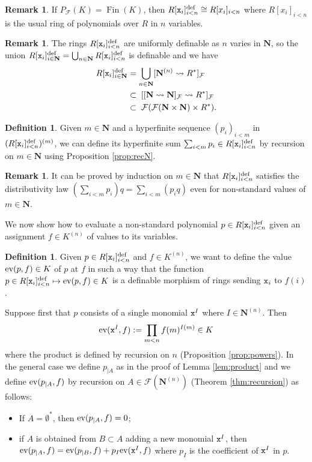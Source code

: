 \documentclass{amsart}
\newcommand{\ca}{\mathcal}
\newcommand{\Fin}{\operatorname{Fin}}
\theoremstyle{plain}
\theoremstyle{definition}
\newtheorem{rem}[thm]{Remark}
\newtheorem{defn}[thm]{Definition}
\newcommand{\ev}{\textnormal{ev}}
\newcommand{\F}{\mathcal{F}}
\newcommand{\pF}{P_{\ca F}}
\newcommand{\hn}{\mathbf N}
\newcommand{\pto}{\leadsto} %
\newcommand{\pfun}[2]{[#1 \pto #2]_{\F}}
\newcommand{\Polyn}[1]{{#1}[{\tt x}_i]_{i \in \hn}^{\text{def}}}
\newcommand{\polyn}[2]{{#1}[{\tt x}_i]_{i<#2}^\text{def}}
\begin{document}
\begin{rem} \label{rem:standard poly} If $\pF(K) = \Fin(K)$, then $\polyn R n \cong R[x_i]_{i<n}$ where $R[x_i]_{i<n}$ is the usual ring of polynomials over $R$ in $n$ variables. 
\end{rem}

\begin{rem}
The rings $\polyn R n$ are uniformly definable as $n$ varies in $\hn$, so the union $\Polyn R = \bigcup_{n\in \hn} \polyn R n$ is definable and we have 
 \begin{align*}
 \Polyn R & = \bigcup_{n\in \hn} \pfun{\hn^{(n)}}{R^*}\\
 & \subset \; \pfun {\pfun {\hn} {\hn}} {R^*}\\
  & \subset \; \F (\F (\hn \times \hn) \times {R^*}).
 \end{align*}
 \end{rem}

\begin{defn} \label{defn:sum of polynomials}
Given $m\in \hn$ and a hyperfinite sequence $(p_i)_{i<m}$ in $({\polyn R n})^{(m)}$, we can define its hyperfinite sum $\sum_{i< m} p_i \in \polyn R n$ by recursion on $m\in \hn$ using Proposition \ref{prop:recN}. 
\end{defn}


\begin{rem}
It can be proved by induction on $m\in \hn$ that $\polyn R n$ satisfies the distributivity  law $(\sum_{i<m} p_i) q = \sum_{i<m} (p_iq)$ even for non-standard values of $m\in \hn$. 
\end{rem}

We now show how to evaluate a non-standard polynomial $p\in \polyn R n$ given an assignment $f\in K^{(n)}$ of values to its variables. 

\begin{defn} \label{defn:ev}
Given $p \in \polyn R n$ and $f\in K^{(n)}$, we want to define the value $\ev(p,f)\in K$ of $p$ at $f$ in such a way that the function $p\in \polyn R n \mapsto \ev(p,f) \in K$ is a definable morphism of rings sending ${\tt x}_i$ to $f(i)$. 

Suppose first that $p$ consists of a single monomial ${\tt x}^I$ where $I\in \hn^{(n)}$. 
Then $$\ev({\tt x}^I, f) := \prod_{m < n} f(m)^{I(m)} \in K$$ where the product is defined by recursion on $n$ (Proposition \ref{prop:powers}).
In the general case we define $p_{|A}$ as in the proof of Lemma \ref{lem:product} and we define
 $\ev(p_{|A},f)$ by recursion on $A\in \F(\hn^{(n)})$ (Theorem \ref{thm:recursion}) as follows:  
\begin{itemize}
	\item 
If $A = \emptyset^*$, then $\ev(p_{|A}, f) = 0$; 
\item if $A$ is obtained from $B\subset A$ adding a new monomial ${\tt x}^I$, then $\ev(p_{|A}, f) = \ev(p_{|B},f) + p_I \ev({\tt x}^I, f)$ where $p_I$ is the coefficient of ${\tt x}^I$ in $p$. 
\end{itemize}
\end{defn} 
\end{document}
